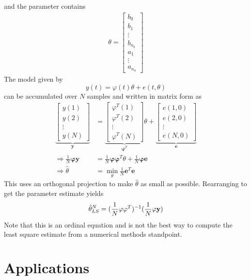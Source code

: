 and the parameter contains
\begin{align}
\label{eq:parameter}
\theta = \left[\begin{array}{c} b_0 \\ b_1 \\ \vdots \\ b_{n_b} \\ a_1 \\ \vdots \\ a_{n_a} \end{array}\right]
\end{align}
The model given by
$$y(t) = \varphi(t)\theta + e(t,\theta)$$
can be accumulated over $N$ samples and written in matrix form as
\begin{align*}
\underbrace{\left[\begin{array}{c} y(1) \\ y(2) \\ \vdots \\ y(N) \end{array}\right]}_{\mathbf{y}} &= \underbrace{\left[\begin{array}{c} \varphi^T(1) \\ \varphi^T(2) \\ \vdots \\ \varphi^T(N) \end{array}\right]}_{\mathbf{\varphi}^T} \theta
+ \underbrace{\left[\begin{array}{c} e(1,0) \\ e(2,0) \\ \vdots \\ e(N,0) \end{array}\right]}_{\mathbf{e}} \\
\Rightarrow \frac{1}{N}\mathbf{\varphi}\mathbf{y} &= \frac{1}{N}\mathbf{\varphi}\mathbf{\varphi}^T\theta + \frac{1}{N}\mathbf{\varphi}\mathbf{e} \\
\Rightarrow \hat{\theta} &= \min_\theta \frac{1}{N}\mathbf{e}^T\mathbf{e}
\end{align*}
This uses an orthogonal projection to make $\hat{\theta}$ as small as possible. Rearranging to get the parameter estimate yields
$$\hat{\theta}_{LS}^N = (\frac{1}{N}\mathbf{\varphi\varphi}^T)^{-1} (\frac{1}{N}\mathbf{\varphi y})$$
Note that this is an ordinal equation and is not the best way to compute the least square estimate from a numerical methods standpoint.

\section{Applications}
